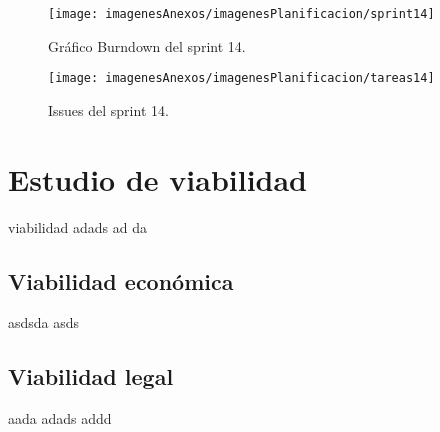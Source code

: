 \begin{figure}[h]
    \begin{center}%
        \begin{center}%
          \texttt{[image: imagenesAnexos/imagenesPlanificacion/sprint14]}%
          \caption{Gráfico Burndown del sprint 14.}%
          \label{figSprint14}%
        \end{center}%
  	\end{center}%
\end{figure}%

\begin{figure}[h]
    \begin{center}%
        \begin{center}%
          \texttt{[image: imagenesAnexos/imagenesPlanificacion/tareas14]}%
          \caption{Issues del sprint 14.}%
          \label{figTareas14}%
        \end{center}%
  	\end{center}%
\end{figure}%

\newpage
\newpage
\section{Estudio de viabilidad}
viabilidad
adads
ad
da
\subsection{Viabilidad económica}
asdsda
asds
\subsection{Viabilidad legal}
aada
adads
addd

